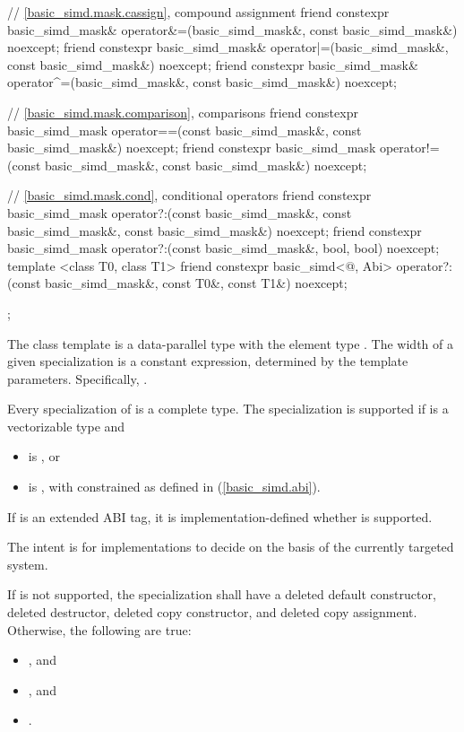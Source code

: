 \begin{codeblock}
{  // \ref{basic_simd.mask.cassign},  compound assignment
  friend constexpr basic_simd_mask& operator&=(basic_simd_mask&, const basic_simd_mask&) noexcept;
  friend constexpr basic_simd_mask& operator|=(basic_simd_mask&, const basic_simd_mask&) noexcept;
  friend constexpr basic_simd_mask& operator^=(basic_simd_mask&, const basic_simd_mask&) noexcept;

  // \ref{basic_simd.mask.comparison},  comparisons
  friend constexpr basic_simd_mask operator==(const basic_simd_mask&, const basic_simd_mask&) noexcept;
  friend constexpr basic_simd_mask operator!=(const basic_simd_mask&, const basic_simd_mask&) noexcept;

  // \ref{basic_simd.mask.cond},  conditional operators
  friend constexpr basic_simd_mask operator?:(const basic_simd_mask&, const basic_simd_mask&, const basic_simd_mask&) noexcept;
  friend constexpr basic_simd_mask operator?:(const basic_simd_mask&, bool, bool) noexcept;
  template <class T0, class T1>
    friend constexpr basic_simd<@\seebelow@, Abi>
      operator?:(const basic_simd_mask&, const T0&, const T1&) noexcept;
};
\end{codeblock}

\pnum
The class template  is a data-parallel type with the element type . The width of a given  specialization is a constant expression, determined by the template parameters. Specifically, .

\pnum
Every specialization of  is a complete type. The specialization  is supported if  is a vectorizable type and
\begin{itemize}
  \item {} is , or
  \item {} is , with  constrained as defined in (\ref{basic_simd.abi}).
\end{itemize}

If  is an extended ABI tag, it is implementation-defined whether  is supported. \begin{note}The intent is for implementations to decide on the basis of the currently targeted system.\end{note}

If  is not supported, the specialization shall have a deleted default constructor, deleted destructor, deleted copy constructor, and deleted copy assignment.
Otherwise, the following are true:
\begin{itemize}
  \item {}, and
  \item {}, and
  \item {}.
\end{itemize}

